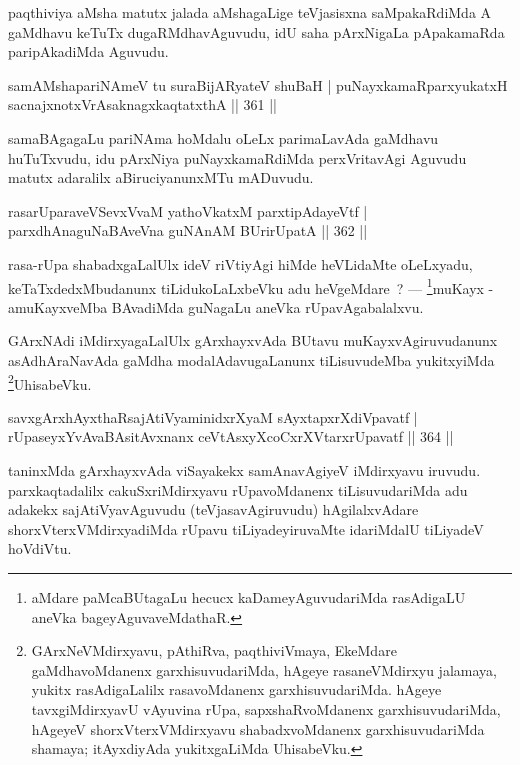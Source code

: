 \begin{artha}
paqthiviya aMsha matutx jalada aMshagaLige teVjasisxna saMpakaRdiMda A gaMdhavu keTuTx dugaRMdhavAguvudu, idU saha pArxNigaLa pApakamaRda paripAkadiMda Aguvudu.
\end{artha}

\begin{shl}
samAMshapariNAmeV tu suraBijARyateV shuBaH |
puNayxkamaRparxyukatxH sacnajxnotxVrAsaknagxkaqtatxthA \hfill || 361 ||
\end{shl}

\begin{artha}
samaBAgagaLu pariNAma hoMdalu oLeLx parimaLavAda gaMdhavu huTuTxvudu, idu pArxNiya puNayxkamaRdiMda perxVritavAgi Aguvudu matutx adaralilx aBiruciyanunxMTu mADuvudu.
\end{artha}

\begin{shl}
rasarUparaveVSevxVvaM yathoVkatxM parxtipAdayeVtf |
parxdhAnaguNaBAveVna guNAnAM BUrirUpatA \hfill  || 362 ||
\end{shl}

\begin{artha}
rasa-rUpa shabadxgaLalUlx ideV riVtiyAgi hiMde heVLidaMte oLeLxyadu, keTaTxdedxMbudanunx tiLidukoLaLxbeVku adu heVgeMdare~?  {\rm ---}  \footnote[1]{aMdare paMcaBUtagaLu hecucx kaDameyAguvudariMda rasAdigaLU aneVka bageyAguvaveMdathaR.}muKayx - amuKayxveMba BAvadiMda guNagaLu aneVka rUpavAgabalalxvu.
\end{artha}

\begin{artha}
GArxNAdi iMdirxyagaLalUlx gArxhayxvAda BUtavu muKayxvAgiruvudanunx asAdhAraNavAda gaMdha modalAdavugaLanunx tiLisuvudeMba yukitxyiMda \footnote[2]{GArxNeVMdirxyavu, pAthiRva, paqthiviVmaya, EkeMdare gaMdhavoMdanenx garxhisuvudariMda, hAgeye rasaneVMdirxyu jalamaya, yukitx rasAdigaLalilx rasavoMdanenx garxhisuvudariMda. hAgeye tavxgiMdirxyavU vAyuvina rUpa, sapxshaRvoMdanenx garxhisuvudariMda, hAgeyeV shorxVterxVMdirxyavu shabadxvoMdanenx garxhisuvudariMda shamaya; itAyxdiyAda yukitxgaLiMda UhisabeVku.}UhisabeVku.
\end{artha}

\begin{shl}
savxgArxhAyxthaRsajAtiVyaminidxrXyaM sAyxtapxrXdiVpavatf |
rUpaseyxYvAvaBAsitAvxnanx ceVtAsxyXcoCxrXVtarxrUpavatf \hfill || 364 ||
\end{shl}

\begin{artha}
taninxMda gArxhayxvAda viSayakekx samAnavAgiyeV iMdirxyavu iruvudu. parxkaqtadalilx cakuSxriMdirxyavu rUpavoMdanenx tiLisuvudariMda adu adakekx sajAtiVyavAguvudu (teVjasavAgiruvudu) hAgilalxvAdare shorxVterxVMdirxyadiMda rUpavu tiLiyadeyiruvaMte idariMdalU tiLiyadeV hoVdiVtu.
\end{artha}

